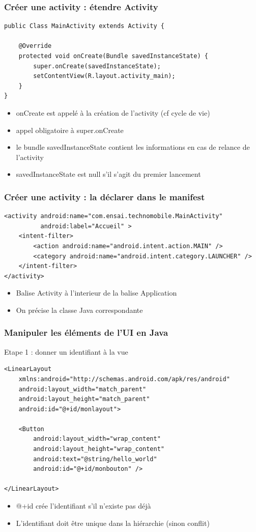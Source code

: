 \documentclass{beamer}
\begin{document}
\begin{frame}[fragile]
\frametitle{Créer une activity : étendre Activity} 
\begin{lstlisting}
public Class MainActivity extends Activity {

    @Override
    protected void onCreate(Bundle savedInstanceState) {
        super.onCreate(savedInstanceState);
        setContentView(R.layout.activity_main);
    }
}
\end{lstlisting}
 \begin{itemize}
 \item onCreate est appelé à la création de l'activity (cf cycle de vie)
 \item appel obligatoire à super.onCreate
 \item le bundle savedInstanceState contient les informations en cas de relance
 de l'activity
 \item savedInstanceState est null s'il s'agit du premier lancement
 \end{itemize}
\end{frame}
\begin{frame}[fragile]
\frametitle{Créer une activity : la déclarer dans le manifest} 
\begin{lstlisting}
<activity android:name="com.ensai.technomobile.MainActivity"
          android:label="Accueil" >
    <intent-filter>
        <action android:name="android.intent.action.MAIN" />
        <category android:name="android.intent.category.LAUNCHER" />
    </intent-filter>
</activity>
\end{lstlisting}
 \begin{itemize}
 \item Balise Activity à l'interieur de la balise Application
 \item On précise la classe Java correspondante
 \end{itemize}
\end{frame}
\begin{frame}[fragile]
\frametitle{Manipuler les éléments de l'UI en Java}
Etape 1 : donner un identifiant à la vue
\begin{lstlisting}
<LinearLayout 
	xmlns:android="http://schemas.android.com/apk/res/android"
    android:layout_width="match_parent"
    android:layout_height="match_parent"
    android:id="@+id/monlayout">

    <Button
        android:layout_width="wrap_content"
        android:layout_height="wrap_content"
        android:text="@string/hello_world"
        android:id="@+id/monbouton" />

</LinearLayout>
\end{lstlisting}
\begin{itemize}
    \item @+id crée l'identifiant s'il n'existe pas déjà
    \item L'identifiant doit être unique dans la hiérarchie (sinon conflit)
 \end{itemize}
\end{frame}
\end{document}
